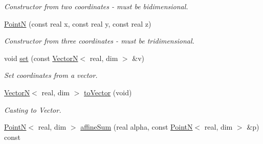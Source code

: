 \begin{DoxyCompactItemize}
\begin{DoxyCompactList}\small\item\em Constructor from two coordinates -\/ must be bidimensional. \end{DoxyCompactList}\item 
\hypertarget{classPointN_a5c33cc8cc3b1071ad6beff66aaf921f2}{
\hyperlink{classPointN_a5c33cc8cc3b1071ad6beff66aaf921f2}{PointN} (const real x, const real y, const real z)}
\label{classPointN_a5c33cc8cc3b1071ad6beff66aaf921f2}

\begin{DoxyCompactList}\small\item\em Constructor from three coordinates -\/ must be tridimensional. \end{DoxyCompactList}\item 
void \hyperlink{classPointN_a98e37e58efb5fdf4f22f38a1eb829ee7}{set} (const \hyperlink{classVectorN}{VectorN}$<$ real, dim $>$ \&v)
\begin{DoxyCompactList}\small\item\em Set coordinates from a vector. \end{DoxyCompactList}\item 
\hypertarget{classPointN_a72bcd72a37795c4a878f69726425d211}{
\hyperlink{classVectorN}{VectorN}$<$ real, dim $>$ \hyperlink{classPointN_a72bcd72a37795c4a878f69726425d211}{toVector} (void)}
\label{classPointN_a72bcd72a37795c4a878f69726425d211}

\begin{DoxyCompactList}\small\item\em Casting to Vector. \end{DoxyCompactList}\item 
\hypertarget{classPointN_a656e5ab6b347867766ef31cda1870827}{
\hyperlink{classPointN}{PointN}$<$ real, dim $>$ \hyperlink{classPointN_a656e5ab6b347867766ef31cda1870827}{affineSum} (real alpha, const \hyperlink{classPointN}{PointN}$<$ real, dim $>$ \&p) const }
\label{classPointN_a656e5ab6b347867766ef31cda1870827}


\end{DoxyCompactItemize}
